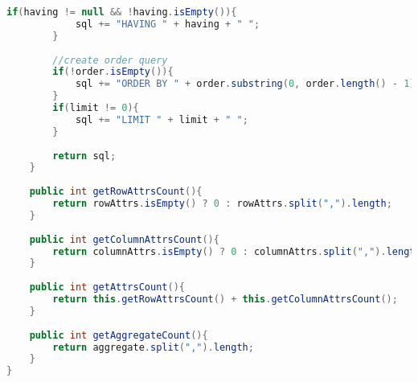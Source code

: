 \begin{lstlisting}[language=Java,basicstyle=\tiny,caption=QueryBuilder.java]
        if(having != null && !having.isEmpty()){
            sql += "HAVING " + having + " ";
        }
        
        //create order query
        if(!order.isEmpty()){
            sql += "ORDER BY " + order.substring(0, order.length() - 1) + " ";
        }
        if(limit != 0){
            sql += "LIMIT " + limit + " ";
        }
        
        return sql;
    }
    
    public int getRowAttrsCount(){
        return rowAttrs.isEmpty() ? 0 : rowAttrs.split(",").length;
    }
    
    public int getColumnAttrsCount(){
        return columnAttrs.isEmpty() ? 0 : columnAttrs.split(",").length;
    }
    
    public int getAttrsCount(){
        return this.getRowAttrsCount() + this.getColumnAttrsCount();
    }
    
    public int getAggregateCount(){
        return aggregate.split(",").length;
    }
}
\end{lstlisting}
